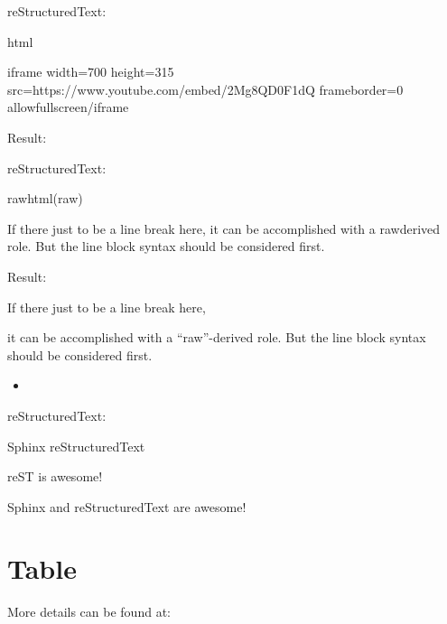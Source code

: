 \documentclass[letterpaper,12pt,english]{sphinxmanual}
\begin{document}
reStructuredText:

\begin{sphinxVerbatim}[commandchars=\\\{\}]
  html

    \PYGZlt{}iframe width=\PYGZdq{}700\PYGZdq{} height=\PYGZdq{}315\PYGZdq{}
    src=\PYGZdq{}https://www.youtube.com/embed/2Mg8QD0F1dQ\PYGZdq{}
    frameborder=\PYGZdq{}0\PYGZdq{} allowfullscreen\PYGZgt{}\PYGZlt{}/iframe\PYGZgt{}
\end{sphinxVerbatim}

Result:



reStructuredText:

\begin{sphinxVerbatim}[commandchars=\\\{\}]
  raw\PYGZhy{}html(raw)
    

If there just  to be a line break here,
it can be accomplished with a \PYGZdq{}raw\PYGZdq{}\PYGZhy{}derived role.
But the line block syntax should be considered first.
\end{sphinxVerbatim}

Result:

If there just  to be a line break here,

it can be accomplished with a “raw”-derived role.
But the line block syntax should be considered first.
\begin{itemize}
\item {} 

\end{itemize}

reStructuredText:

\begin{sphinxVerbatim}[commandchars=\\\{\}]
   Sphinx
   reStructuredText

\textbar{}reST\textbar{} is awesome!
\end{sphinxVerbatim}

Sphinx and reStructuredText are awesome!


\section{Table}
\label{\detokenize{rtxt:table}}
More details can be found at: 
\end{document}
